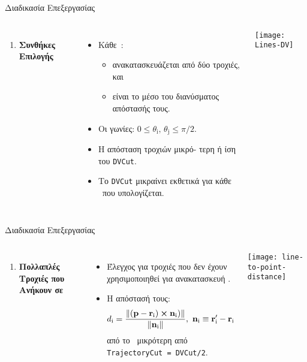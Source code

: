 \begin{frame}{Διαδικασία Επεξεργασίας}
	
	\begin{columns}
	\begin{enumerate}
		\conti
		\item \textbf{Συνθήκες Επιλογής \dvrecobf}
		\seti
	\end{enumerate}
	\vspace{4 mm}
	\begin{itemize}%
		\item Κάθε \dvreco\,: 
			\begin{itemize}
				\item ανακατασκευάζεται από δύο τροχιές, και
				\item είναι το μέσο του διανύσματος απόστασής τους.
			\end{itemize}
		\item Οι γωνίες: $0\leq\theta_\mathrm{i},\, \theta_\mathrm{j} \leq \pi/2$.
		\item Η απόσταση τροχιών μικρό- τερη ή ίση του \texttt{DVCut}.
		\item Tο \texttt{DVCut} μικραίνει εκθετικά για κάθε \dvreco\ που υπολογίζεται.
	\end{itemize}
	\texttt{[image: Lines-DV]}
	\end{columns}
\end{frame}

\begin{frame}{Διαδικασία Επεξεργασίας}
	
	\begin{columns}
	\column{0.7\textwidth}
	\begin{enumerate}
		\conti
		\item \textbf{Πολλαπλές Τροχιές που Ανήκουν σε }\dvrecobf
		\seti
	\end{enumerate}
	\begin{itemize}
		\item Έλεγχος για τροχιές που δεν έχουν χρησιμοποιηθεί για ανακατασκευή \dvreco.
		\item Η απόστασή τους:
			\begin{equation*}
				d_\mathrm{i} = \frac{\norm{(\vb{p}-\vb{r}_\mathrm{i})\cross\vb{n}_\mathrm{i})}}{\norm{\vb{n}_\mathrm{i}}},\ \vb{n}_\mathrm{i} \equiv \vb{r}'_\mathrm{i}-\vb{r}_\mathrm{i}
			\end{equation*}
		 από το \dvreco\ μικρότερη από \texttt{TrajectoryCut = DVCut/2}.
	\end{itemize}
	\column{0.3\textwidth}	
	\texttt{[image: line-to-point-distance]}
	\end{columns}
\end{frame}

